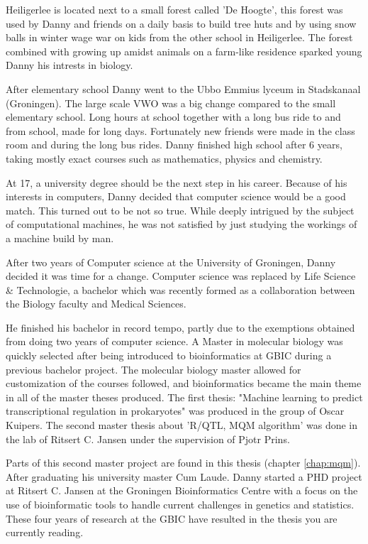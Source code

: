 Heiligerlee is located next to a small forest called 'De Hoogte', this forest was used 
by Danny and friends on a daily basis to build tree huts and by using snow balls in winter 
wage war on kids from the other school in Heiligerlee. The forest combined with growing up 
amidst animals on a farm-like residence sparked young Danny his intrests in biology.

After elementary school Danny went to the Ubbo Emmius lyceum in Stadskanaal (Groningen). 
The large scale VWO was a big change compared to the small elementary school. Long hours at school 
together with a long bus ride to and from school, made for long days. Fortunately new 
friends were made in the class room and during the long bus rides. Danny finished high 
school after 6 years, taking mostly exact courses such as mathematics, physics and chemistry.

At 17, a university degree should be the next step in his career. Because of his interests 
in computers, Danny decided that computer science would be a good match. This turned out 
to be not so true. While deeply intrigued by the subject of computational machines, he 
was not satisfied by just studying the workings of a machine build by man.

After two years of Computer science at the University of Groningen, Danny decided it was time 
for a change. Computer science was replaced by Life Science \& Technologie, a bachelor which 
was recently formed as a collaboration between the Biology faculty and Medical Sciences.

He finished his bachelor in record tempo, partly due to the exemptions obtained from 
doing two years of computer science. A Master in molecular biology was quickly selected after
being introduced to bioinformatics at GBIC during a previous bachelor project. The molecular 
biology master allowed for customization of the courses followed, and bioinformatics became the main 
theme in all of the master theses produced. The first thesis: "Machine learning to predict 
transcriptional regulation in prokaryotes" was produced in the group of Oscar Kuipers. 
The second master thesis about 'R/QTL, MQM algorithm' was done in the lab of Ritsert C. Jansen 
under the supervision of Pjotr Prins.

Parts of this second master project are found in this thesis (chapter \ref{chap:mqm}).
After graduating his university master Cum Laude. Danny started a PHD project at Ritsert 
C. Jansen at the Groningen Bioinformatics Centre with a focus on the use of bioinformatic 
tools to handle current challenges in genetics and statistics. These four years of research 
at the GBIC have resulted in the thesis you are currently reading.\\\\

